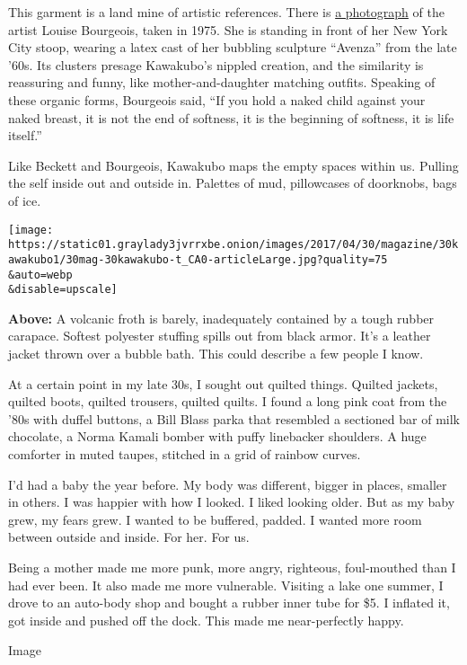 This garment is a land mine of artistic references. There is
\href{https://www.theguardian.com/lifeandstyle/2016/mar/14/louise-bourgeois-feminist-art-sculptor-bilbao-guggenheim-women\#img-3}{a
photograph} of the artist Louise Bourgeois, taken in 1975. She is
standing in front of her New York City stoop, wearing a latex cast of
her bubbling sculpture ``Avenza'' from the late '60s. Its clusters
presage Kawakubo's nippled creation, and the similarity is reassuring
and funny, like mother-and-daughter matching outfits. Speaking of these
organic forms, Bourgeois said, ``If you hold a naked child against your
naked breast, it is not the end of softness, it is the beginning of
softness, it is life itself.''

Like Beckett and Bourgeois, Kawakubo maps the empty spaces within us.
Pulling the self inside out and outside in. Palettes of mud, pillowcases
of doorknobs, bags of ice.

\texttt{[image: https://static01.graylady3jvrrxbe.onion/images/2017/04/30/magazine/30kawakubo1/30mag-30kawakubo-t\_CA0-articleLarge.jpg?quality=75\\\&auto=webp\\\&disable=upscale]}

\textbf{Above:} A volcanic froth is barely, inadequately contained by a
tough rubber carapace. Softest polyester stuffing spills out from black
armor. It's a leather jacket thrown over a bubble bath. This could
describe a few people I know.

At a certain point in my late 30s, I sought out quilted things. Quilted
jackets, quilted boots, quilted trousers, quilted quilts. I found a long
pink coat from the '80s with duffel buttons, a Bill Blass parka that
resembled a sectioned bar of milk chocolate, a Norma Kamali bomber with
puffy linebacker shoulders. A huge comforter in muted taupes, stitched
in a grid of rainbow curves.

I'd had a baby the year before. My body was different, bigger in places,
smaller in others. I was happier with how I looked. I liked looking
older. But as my baby grew, my fears grew. I wanted to be buffered,
padded. I wanted more room between outside and inside. For her. For us.

Being a mother made me more punk, more angry, righteous, foul-mouthed
than I had ever been. It also made me more vulnerable. Visiting a lake
one summer, I drove to an auto-body shop and bought a rubber inner tube
for \$5. I inflated it, got inside and pushed off the dock. This made me
near-perfectly happy.

Image

